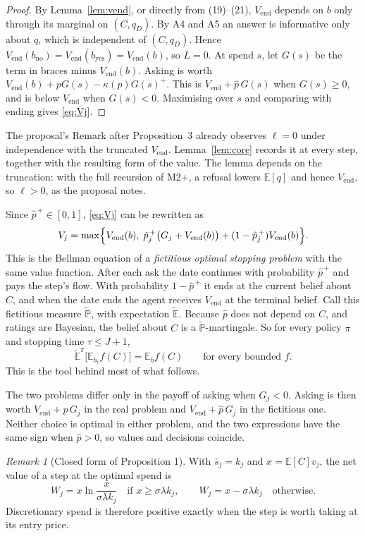 \documentclass[11pt,a4paper]{article}
\theoremstyle{definition}
\theoremstyle{remark}
\newtheorem{remark}[theorem]{Remark}
\newcommand{\E}{\mathbb{E}}
\newcommand{\Vend}{V_{\mathrm{end}}}
\newcommand{\pp}{\hat p}
\newcommand{\Pt}{\tilde{\mathbb P}}
\newcommand{\Et}{\tilde{\mathbb E}}
\begin{document}
\begin{proof}
By Lemma~\ref{lem:vend}, or directly from (19)--(21), $\Vend$ depends on $b$ only through its marginal on $(C,q_D)$. By A4 and A5 an answer is informative only about $q$, which is independent of $(C,q_D)$. Hence $\Vend(b_{\mathrm{no}})=\Vend(b_{\mathrm{yes}})=\Vend(b)$, so $L=0$. At spend $s$, let $G(s)$ be the term in braces minus $\Vend(b)$. Asking is worth $\Vend(b)+pG(s)-\kappa(p)G(s)^+$. This is $\Vend+\pp\,G(s)$ when $G(s)\ge0$, and is below $\Vend$ when $G(s)<0$. Maximising over $s$ and comparing with ending gives \eqref{eq:Vj}.
\end{proof}

The proposal's Remark after Proposition~3 already observes $\ell=0$ under independence with the truncated $\Vend$. Lemma~\ref{lem:core} records it at every step, together with the resulting form of the value. The lemma depends on the truncation: with the full recursion of M2+, a refusal lowers $\E[q]$ and hence $\Vend$, so $\ell>0$, as the proposal notes.

Since $\pp^{\,+}\in[0,1]$, \eqref{eq:Vj} can be rewritten as
\[
V_j=\max\Bigl\{\Vend(b),\;\pp_j^{\,+}\bigl(G_j+\Vend(b)\bigr)+(1-\pp_j^{\,+})\Vend(b)\Bigr\}.
\]
This is the Bellman equation of a \emph{fictitious optimal stopping problem} with the same value function. After each ask the date continues with probability $\pp^{\,+}$ and pays the step's flow. With probability $1-\pp^{\,+}$ it ends at the current belief about $C$, and when the date ends the agent receives $\Vend$ at the terminal belief. Call this fictitious measure $\Pt$, with expectation $\Et$. Because $\pp$ does not depend on $C$, and ratings are Bayesian, the belief about $C$ is a $\Pt$-martingale. So for every policy $\pi$ and stopping time $\tau\le J+1$,
\begin{equation}\label{eq:mart}
\Et^{\pi}\bigl[\E_{b_\tau}f(C)\bigr]=\E_bf(C)\qquad\text{for every bounded }f.
\end{equation}
This is the tool behind most of what follows.

The two problems differ only in the payoff of asking when $G_j<0$. Asking is then worth $\Vend+p\,G_j$ in the real problem and $\Vend+\pp\,G_j$ in the fictitious one. Neither choice is optimal in either problem, and the two expressions have the same sign when $\pp>0$, so values and decisions coincide.

\begin{remark}[Closed form of Proposition 1]\label{rem:closed}
With $\bar s_j=k_j$ and $x=\E[C]v_j$, the net value of a step at the optimal spend is
\[
W_j=x\ln\!\frac{x}{\sigma\lambda k_j}\quad\text{if }x\ge\sigma\lambda k_j,\qquad W_j=x-\sigma\lambda k_j\quad\text{otherwise.}
\]
Discretionary spend is therefore positive exactly when the step is worth taking at its entry price.
\end{remark}
\end{document}
